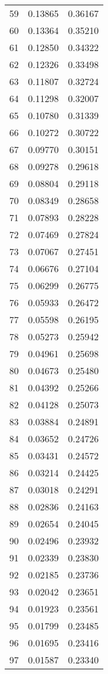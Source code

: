 \documentclass{elsarticle}
\begin{document}
\begin{center}
\begin{longtable}{|c|cc|}
  59 & 0.13865 & 0.36167 \\
  60 & 0.13364 & 0.35210 \\
  61 & 0.12850 & 0.34322 \\
  62 & 0.12326 & 0.33498 \\
  63 & 0.11807 & 0.32724 \\
  64 & 0.11298 & 0.32007 \\
  65 & 0.10780 & 0.31339 \\
  66 & 0.10272 & 0.30722 \\
  67 & 0.09770 & 0.30151 \\
  68 & 0.09278 & 0.29618 \\
  69 & 0.08804 & 0.29118 \\
  70 & 0.08349 & 0.28658 \\
  71 & 0.07893 & 0.28228 \\
  72 & 0.07469 & 0.27824 \\
  73 & 0.07067 & 0.27451 \\
  74 & 0.06676 & 0.27104 \\
  75 & 0.06299 & 0.26775 \\
  76 & 0.05933 & 0.26472 \\
  77 & 0.05598 & 0.26195 \\
  78 & 0.05273 & 0.25942 \\
  79 & 0.04961 & 0.25698 \\
  80 & 0.04673 & 0.25480 \\
  81 & 0.04392 & 0.25266 \\
  82 & 0.04128 & 0.25073 \\
  83 & 0.03884 & 0.24891 \\
  84 & 0.03652 & 0.24726 \\
  85 & 0.03431 & 0.24572 \\
  86 & 0.03214 & 0.24425 \\
  87 & 0.03018 & 0.24291 \\
  88 & 0.02836 & 0.24163 \\
  89 & 0.02654 & 0.24045 \\
  90 & 0.02496 & 0.23932 \\
  91 & 0.02339 & 0.23830 \\
  92 & 0.02185 & 0.23736 \\
  93 & 0.02042 & 0.23651 \\
  94 & 0.01923 & 0.23561 \\
  95 & 0.01799 & 0.23485 \\
  96 & 0.01695 & 0.23416 \\
  97 & 0.01587 & 0.23340 \\

\end{longtable}
\end{center}
\end{document}
